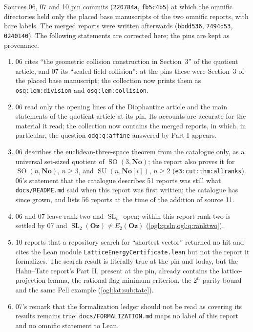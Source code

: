 \documentclass[11pt,oneside]{article}
\numberwithin{equation}{section}
\theoremstyle{definition}
\theoremstyle{remark}
\newcommand{\No}{\mathbf{No}}
\newcommand{\Oz}{\mathbf{Oz}}
\newcommand{\SC}{\No[i]}
\newcommand{\SL}{\operatorname{SL}}
\newcommand{\SO}{\operatorname{SO}}
\newcommand{\SU}{\operatorname{SU}}
\newcommand{\replabel}[1]{\nolinkurl{#1}}
\newcommand{\fn}[1]{\nolinkurl{#1}}
\begin{document}
Sources 06, 07 and 10 pin commits (\texttt{220784a}, \texttt{fb5c4b5}) at which the
omnific directories held only the placed base manuscripts of the two omnific
reports, with bare labels. The merged reports were written afterwards
(\texttt{bbdd536}, \texttt{7494d53}, \texttt{0240140}). The following statements
are corrected here; the pins are kept as provenance.
\begin{enumerate}[leftmargin=*]
\item 06 cites ``the geometric collision construction in Section~3'' of the
quotient article, and 07 its ``scaled-field collision'': at the pins these were
Section~3 of the placed base manuscript; the collection now prints them as
\replabel{osq:lem:division} and \replabel{osq:lem:collision}.
\item 06 read only the opening lines of the Diophantine article and the main
statements of the quotient article at its pin. Its accounts are accurate for the
material it read; the collection now contains the merged reports, in which, in
particular, the question \replabel{odg:q:affine} answered by Part I appears.
\item 06 describes the euclidean-three-space theorem from the catalogue only, as a
universal set-sized quotient of $\SO(3,\No)$; the report also proves it for
$\SO(n,\No)$, $n\ge3$, and $\SU(n,\SC)$, $n\ge2$ (\replabel{e3:cut:thm:allranks}).
06's statement that the catalogue describes 51 reports was still what
\fn{docs/README.md} said when this report was first written; the catalogue has
since grown, and lists 56 reports at the time of the addition of source 11.
\item 06 and 07 leave rank two and $\SL_n$ open; within this report rank two is
settled by 07 and $\SL_2(\Oz)\ne E_2(\Oz)$ (\cref{ogl:q:sln,ogl:q:ranktwo}).
\item 10 reports that a repository search for ``shortest vector'' returned no hit
and cites the Lean module \fn{LatticeEnergyCertificate.lean} but not the report it
formalizes. The search result is literally true at the pin and today, but the
Hahn--Tate report's Part II, present at the pin, already contains the
lattice-projection lemma, the rational-flag minimum criterion, the $2^n$ parity
bound and the same Pell example (\cref{ogl:lat:sub:tate}).
\item 07's remark that the formalization ledger should not be read as covering
its results remains true: \fn{docs/FORMALIZATION.md} maps no label of this report
and no omnific statement to Lean.
\end{enumerate}
\end{document}
